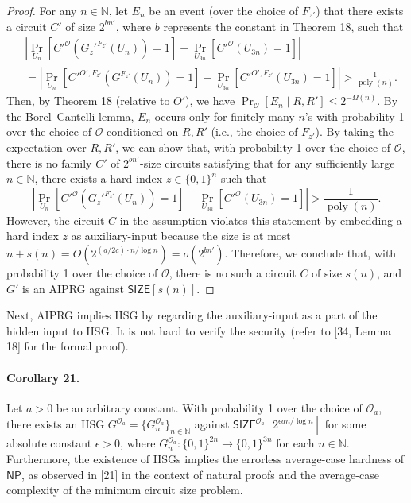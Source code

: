 \documentclass[10pt,a4paper]{article}
\begin{document}
\begin{proof}
For any $n\in\mathbb N$, let $E_n$ be an event (over the choice of $F_{z'}$) that there exists a circuit $C'$ of size $2^{bn'}$, where $b$ represents the constant in Theorem 18, such that
\begin{align*}
&\left|\Pr_{U_n}[C'^{\mathcal O}(G_z'^{F_{z'}}(U_n))=1]-\Pr_{U_{3n}}[C'^{\mathcal O}(U_{3n})=1]\right|\\
&=\left|\Pr_{U_n}[C'^{O',F_{z'}}(G^{F_{z'}}(U_n))=1]-\Pr_{U_{3n}}[C'^{O',F_{z'}}(U_{3n})=1]\right|>\frac1{\operatorname{poly}(n)}.
\end{align*}
Then, by Theorem 18 (relative to $O'$), we have $\Pr_{\mathcal O}[E_n\mid R,R']\leq2^{-\Omega(n)}$. By the Borel--Cantelli lemma, $E_n$ occurs only for finitely many $n$'s with probability 1 over the choice of $\mathcal O$ conditioned on $R,R'$ (i.e., the choice of $F_{z'}$). By taking the expectation over $R,R'$, we can show that, with probability 1 over the choice of $\mathcal O$, there is no family $C'$ of $2^{bn'}$-size circuits satisfying that for any sufficiently large $n\in\mathbb N$, there exists a hard index $z\in\{0,1\}^n$ such that
\[\left|\Pr_{U_n}[C'^{\mathcal O}(G_z'^{F_{z'}}(U_n))=1]-\Pr_{U_{3n}}[C'^{\mathcal O}(U_{3n})=1]\right|>\frac1{\operatorname{poly}(n)}.\]
However, the circuit $C$ in the assumption violates this statement by embedding a hard index $z$ as auxiliary-input because the size is at most $n+s(n)=O(2^{(a/2c)\cdot n/\log n})=o(2^{bn'})$. Therefore, we conclude that, with probability 1 over the choice of $\mathcal O$, there is no such a circuit $C$ of size $s(n)$, and $G'$ is an AIPRG against $\mathsf{SIZE}[s(n)]$.
\end{proof}
Next, AIPRG implies HSG by regarding the auxiliary-input as a part of the hidden input to HSG. It is not hard to verify the security (refer to [34, Lemma 18] for the formal proof).
\paragraph{Corollary 21.}
Let $a>0$ be an arbitrary constant. With probability 1 over the choice of $\mathcal O_a$, there exists an HSG $G^{\mathcal O_a}=\{G_n^{\mathcal O_a}\}_{n\in\mathbb N}$ against $\mathsf{SIZE}^{\mathcal O_a}[2^{\epsilon an/\log n}]$ for some absolute constant $\epsilon>0$, where $G_n^{\mathcal O_a}:\{0,1\}^{2n}\to\{0,1\}^{3n}$ for each $n\in\mathbb N$.
Furthermore, the existence of HSGs implies the errorless average-case hardness of $\mathsf{NP}$, as observed in [21] in the context of natural proofs and the average-case complexity of the minimum circuit size problem.
\end{document}
